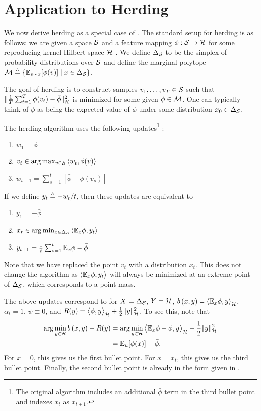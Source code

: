 \documentclass[paper.tex]{subfiles}
\begin{document}
\section{Application to Herding}
\label{sec:herding}

We now derive herding as a special case of \dual. The standard setup for herding is as follows: we are given a 
space $\mathcal{S}$ and a feature mapping $\phi : \mathcal{S} \to \mathcal{H}$ for some 
reproducing kernel Hilbert space $\mathcal{H}$ \cite{Hofmann:2008}. 
We define $\Delta_{\mathcal{S}}$ to be the simplex 
of probability distributions over $\mathcal{S}$ and define the marginal polytope 
$\mathcal{M} \triangleq \{\mathbb{E}_{v \sim x}[\phi(v)] \mid x \in \Delta_{\mathcal{S}}\}$.

The goal of herding is to construct samples $v_1,\ldots,v_T \in \mathcal{S}$ 
such that $\|\frac{1}{T}\sum_{t=1}^T \phi(v_t)-\bar{\phi}\|_{\mathcal{H}}^2$ 
is minimized for some given $\bar{\phi} \in \mathcal{M}$. One can typically
think of $\bar \phi$ as being the expected value of $\phi$ under some 
distribution $x_{0} \in \Delta_{\mathcal{S}}$. 

The herding algorithm uses the following updates\footnote{The original 
algorithm includes an additional $\bar{\phi}$ term in the third bullet 
point and indexes $x_t$ as $x_{t+1}$.} \citep[][equations (1) and (2)]{Chen:2010a}:
\begin{enumerate}
\item $w_1 = \bar{\phi}$
\item $v_t \in \arg\max_{v \in \mathcal{S}} \left\langle w_t, \phi(v) \right\rangle$
\item $w_{t+1} = \sum_{s=1}^t [\bar{\phi}-\phi(v_s)]$
\end{enumerate}
If we define $y_t \triangleq -w_t/t$, then these updates are equivalent to
\begin{enumerate}
\item $y_1 = -\bar{\phi}$
\item $x_t \in \arg\min_{x \in \Delta_{\mathcal{S}}} \left\langle \mathbb{E}_{x}\phi, y_t \right\rangle$
\item $y_{t+1} = \frac{1}{t} \sum_{s=1}^t \mathbb{E}_{x}\phi - \bar{\phi}$
\end{enumerate}
Note that we have replaced the point $v_t$ with a distribution $x_t$. 
This does not change the algorithm as $\left\langle \mathbb{E}_{x}\phi, y_t \right\rangle$ will 
always be minimized at an extreme point of $\Delta_{\mathcal{S}}$, which corresponds 
to a point mass.

The above updates correspond to \dual for $X = \Delta_{\mathcal{S}}$, $Y = \mathcal{H}$, 
$b\left(x, y\right) = \left\langle \mathbb{E}_{x}\phi, y \right\rangle_{\mathcal{H}}$, $\alpha_t = 1$, $\psi \equiv 0$, and
$R(y) = \left\langle \bar{\phi}, y \right\rangle_{\mathcal{H}} + \frac{1}{2}\|y\|_{\mathcal{H}}^2$.
To see this, note that 
\begin{align}
\arg\min_{y \in \mathcal{H}} b\left(x, y\right) - R(y)
 &= \arg\min_{y \in \mathcal{H}} \left\langle \mathbb{E}_{x}\phi-\bar{\phi}, y \right\rangle_{\mathcal{H}} - \frac{1}{2}\|y\|_{\mathcal{H}}^2 \\
 &= \mathbb{E}_u[\phi(x)] - \bar{\phi}.
\end{align}
For $x = 0$, this gives us the first bullet point. For $x = \bar{x}_t$, 
this gives us the third bullet point. Finally, the second bullet point 
is already in the form given in \dual.
\end{document}
